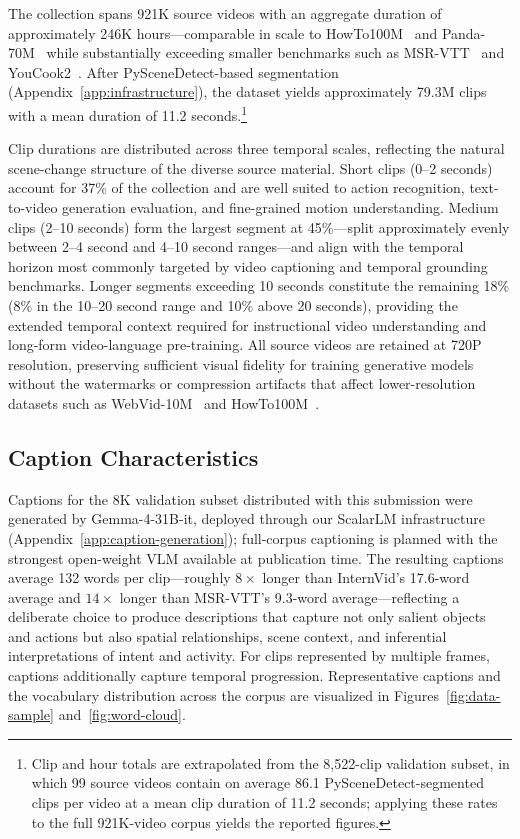 \documentclass{article}
\begin{document}
The collection spans 921K source videos with an aggregate duration of approximately 246K hours---comparable in scale to HowTo100M~\cite{miech2019howto100m} and Panda-70M~\cite{chen2024panda70m} while substantially exceeding smaller benchmarks such as MSR-VTT~\cite{xu2016msrvtt} and YouCook2~\cite{zhou2018youcook2}. After PySceneDetect-based segmentation (Appendix~\ref{app:infrastructure}), the dataset yields approximately 79.3M clips with a mean duration of 11.2 seconds.\footnote{Clip and hour totals are extrapolated from the 8{,}522-clip validation subset, in which 99 source videos contain on average 86.1 PySceneDetect-segmented clips per video at a mean clip duration of 11.2 seconds; applying these rates to the full 921K-video corpus yields the reported figures.}

Clip durations are distributed across three temporal scales, reflecting the natural scene-change structure of the diverse source material. Short clips (0--2 seconds) account for 37\% of the collection and are well suited to action recognition, text-to-video generation evaluation, and fine-grained motion understanding. Medium clips (2--10 seconds) form the largest segment at 45\%---split approximately evenly between 2--4 second and 4--10 second ranges---and align with the temporal horizon most commonly targeted by video captioning and temporal grounding benchmarks. Longer segments exceeding 10 seconds constitute the remaining 18\% (8\% in the 10--20 second range and 10\% above 20 seconds), providing the extended temporal context required for instructional video understanding and long-form video-language pre-training. All source videos are retained at 720P resolution, preserving sufficient visual fidelity for training generative models without the watermarks or compression artifacts that affect lower-resolution datasets such as WebVid-10M~\cite{bain2021frozen} and HowTo100M~\cite{miech2019howto100m}.

\subsection{Caption Characteristics}

Captions for the 8K validation subset distributed with this submission were generated by Gemma-4-31B-it, deployed through our ScalarLM infrastructure (Appendix~\ref{app:caption-generation}); full-corpus captioning is planned with the strongest open-weight VLM available at publication time. The resulting captions average 132 words per clip---roughly $8\times$ longer than InternVid's 17.6-word average and $14\times$ longer than MSR-VTT's 9.3-word average---reflecting a deliberate choice to produce descriptions that capture not only salient objects and actions but also spatial relationships, scene context, and inferential interpretations of intent and activity. For clips represented by multiple frames, captions additionally capture temporal progression. Representative captions and the vocabulary distribution across the corpus are visualized in Figures~\ref{fig:data-sample} and~\ref{fig:word-cloud}.
\end{document}

